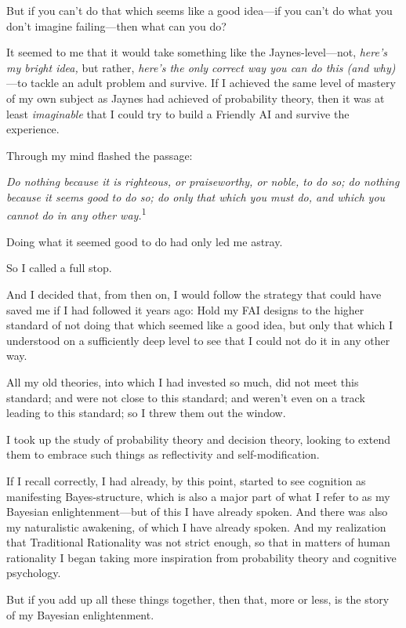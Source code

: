 {
 But if you can't do that which seems like a good
idea---if you can't do what you don't
imagine failing---then what can you do?}

{
 It seemed to me that it would take something like the
Jaynes-level---not, \textit{here's my bright idea,} but
rather, \textit{here's the only correct way you can do
this (and why)}{}---to tackle an adult problem and survive. If I
achieved the same level of mastery of my own subject as Jaynes had
achieved of probability theory, then it was at least
\textit{imaginable} that I could try to build a Friendly AI and survive
the experience.}

{
 Through my mind flashed the passage:}

{
 \textit{Do nothing because it is righteous, or praiseworthy, or
noble, to do so; do nothing because it seems good to do so; do only
that which you must do, and which you cannot do in any other
way.}\textsuperscript{1}}

{
 Doing what it seemed good to do had only led me astray.}

{
 So I called a full stop.}

{
 And I decided that, from then on, I would follow the strategy that
could have saved me if I had followed it years ago: Hold my FAI designs
to the higher standard of not doing that which seemed like a good idea,
but only that which I understood on a sufficiently deep level to see
that I could not do it in any other way.}

{
 All my old theories, into which I had invested so much, did not
meet this standard; and were not close to this standard; and
weren't even on a track leading to this standard; so I
threw them out the window.}

{
 I took up the study of probability theory and decision theory,
looking to extend them to embrace such things as reflectivity and
self-modification.}

{
 If I recall correctly, I had already, by this point, started to
see cognition as manifesting Bayes-structure, which is also a major
part of what I refer to as my Bayesian enlightenment---but of this I
have already spoken. And there was also my naturalistic awakening, of
which I have already spoken. And my realization that Traditional
Rationality was not strict enough, so that in matters of human
rationality I began taking more inspiration from probability theory and
cognitive psychology.}

{
 But if you add up all these things together, then that, more or
less, is the story of my Bayesian enlightenment.}

